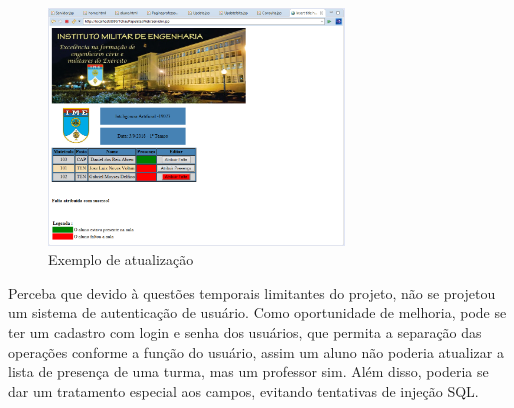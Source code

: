 \begin{figure}[!ht]
	\centering
\includegraphics[width=0.70\textwidth]{img/atualizacao.png}   
	\caption{Exemplo de atualização}
	\label{fig:figura69}
\end{figure}

Perceba que devido à questões temporais limitantes do projeto, não se projetou um sistema de autenticação de usuário. Como oportunidade de melhoria, pode se ter um cadastro com login e senha dos usuários, que permita a separação das operações conforme a função do usuário, assim um aluno não poderia atualizar a lista de presença de uma turma, mas um professor sim. Além disso, poderia se dar um tratamento especial aos campos, evitando tentativas de injeção SQL. 






